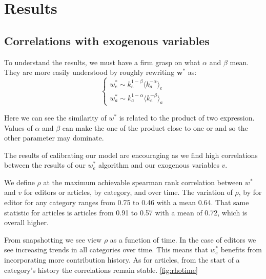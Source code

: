 \section{Results}


\subsection{Correlations with exogenous variables}

To understand the results, we must have a firm grasp on what $\alpha$ and $\beta$ mean. They are more easily understood by roughly rewriting $\mathbf{w^*}$ as:
\begin{equation}
\begin{cases}
w^{*}_{e} \sim k^{1-\beta}_{e} \langle k_{a}^{-\alpha}\rangle_e \\

w^{*}_{a} \sim k^{1-\alpha}_{a} \langle k_{e}^{-\beta}\rangle_a
\end{cases} \label{eqsim}
\end{equation}

Here we can see the similarity of $w^*$ is related to the product of two expression. Values of $\alpha$ and $\beta$ can make the one of the product close to one or and so the other parameter may dominate.

The results of calibrating our model are encouraging as we find high correlations between the results of our $w^*_e$ algorithm and our exogenous variables $v$. 

We define $\rho$ at the maximum achievable spearman rank correlation between $w^*$ and $v$ for editors or articles, by category, and over time. The variation of $\rho$, by for editor for any category ranges from 0.75 to 0.46 with a mean 0.64.  That same statistic for articles is articles from 0.91 to 0.57 with a mean of 0.72, which is overall higher.

 
From snapshotting we see view $\rho$ as  a function of time. In the case of editors we see increasing trends in all categories over time. This means that $w^*_e$ benefits from incorporating more contribution history. As for articles, from the start of a category's history the correlations remain stable. \ref{fig:rhotime}

